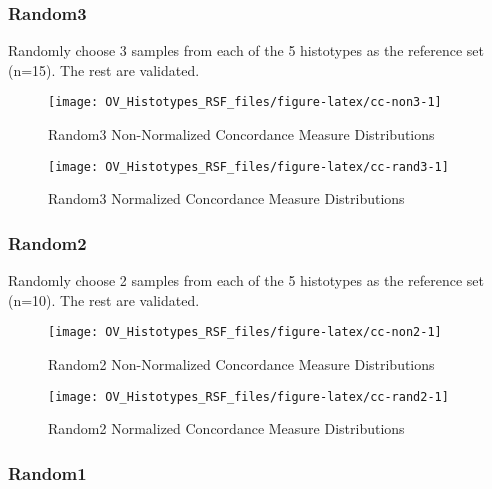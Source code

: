 \documentclass[
]{report}
\begin{document}
\hypertarget{random3}{%
\subsubsection{Random3}\label{random3}}

Randomly choose 3 samples from each of the 5 histotypes as the reference set (n=15). The rest are validated.

\begin{figure}[H]

{\centering \texttt{[image: OV\_Histotypes\_RSF\_files/figure-latex/cc-non3-1]} 

}

\caption{Random3 Non-Normalized Concordance Measure Distributions}\label{fig:cc-non3}
\end{figure}

\begin{figure}[H]

{\centering \texttt{[image: OV\_Histotypes\_RSF\_files/figure-latex/cc-rand3-1]} 

}

\caption{Random3 Normalized Concordance Measure Distributions}\label{fig:cc-rand3}
\end{figure}

\hypertarget{random2}{%
\subsubsection{Random2}\label{random2}}

Randomly choose 2 samples from each of the 5 histotypes as the reference set (n=10). The rest are validated.

\begin{figure}[H]

{\centering \texttt{[image: OV\_Histotypes\_RSF\_files/figure-latex/cc-non2-1]} 

}

\caption{Random2 Non-Normalized Concordance Measure Distributions}\label{fig:cc-non2}
\end{figure}

\begin{figure}[H]

{\centering \texttt{[image: OV\_Histotypes\_RSF\_files/figure-latex/cc-rand2-1]} 

}

\caption{Random2 Normalized Concordance Measure Distributions}\label{fig:cc-rand2}
\end{figure}

\hypertarget{random1}{%
\subsubsection{Random1}\label{random1}}
\end{document}
